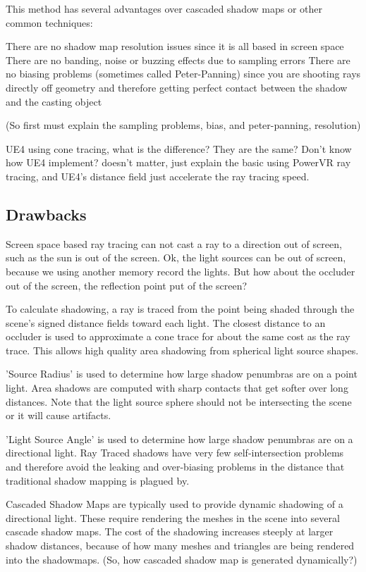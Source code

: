 This method has several advantages over cascaded shadow maps or other common techniques:

There are no shadow map resolution issues since it is all based in screen space
There are no banding, noise or buzzing effects due to sampling errors
There are no biasing problems (sometimes called Peter-Panning) since you are shooting rays directly off geometry and therefore getting perfect contact between the shadow and the casting object

(So first must explain the sampling problems, bias, and peter-panning, resolution)




UE4 using cone tracing, what is the difference? They are the same?
Don't know how UE4 implement? doesn't matter, just explain the basic using PowerVR ray tracing, and UE4's distance field just accelerate the ray tracing speed.



\subsection{Drawbacks}
Screen space based ray tracing can not cast a ray to a direction out of screen, such as the sun is out of the screen.
Ok, the light sources can be out of screen, because we using another memory record the lights. But how about the occluder out of the screen, the reflection point put of the screen?




To calculate shadowing, a ray is traced from the point being shaded through the scene's signed distance fields toward each light. The closest distance to an occluder is used to approximate a cone trace for about the same cost as the ray trace. This allows high quality area shadowing from spherical light source shapes.

'Source Radius' is used to determine how large shadow penumbras are on a point light. Area shadows are computed with sharp contacts that get softer over long distances. Note that the light source sphere should not be intersecting the scene or it will cause artifacts.

'Light Source Angle' is used to determine how large shadow penumbras are on a directional light. Ray Traced shadows have very few self-intersection problems and therefore avoid the leaking and over-biasing problems in the distance that traditional shadow mapping is plagued by.

Cascaded Shadow Maps are typically used to provide dynamic shadowing of a directional light. These require rendering the meshes in the scene into several cascade shadow maps. The cost of the shadowing increases steeply at larger shadow distances, because of how many meshes and triangles are being rendered into the shadowmaps.
(So, how cascaded shadow map is generated dynamically?)

